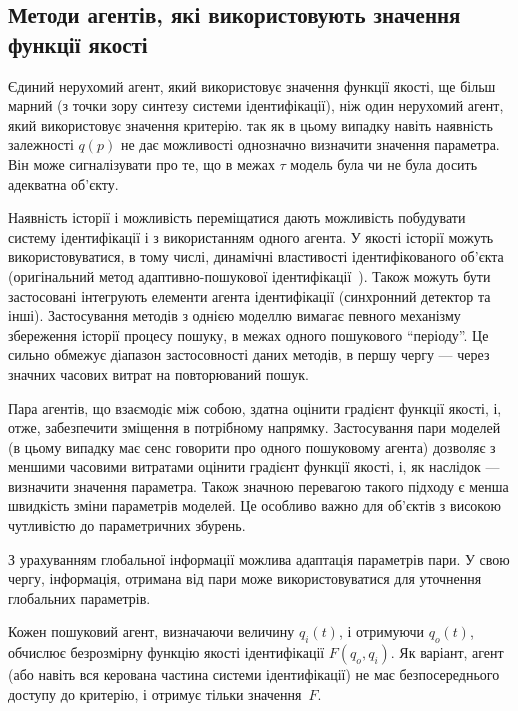
\subsection{Методи агентів, які використовують значення функції якості}%

Єдиний нерухомий агент, який використовує значення функції якості, ще більш марний
(з точки зору синтезу системи ідентифікації), ніж один нерухомий агент, який
використовує значення критерію.
%
так як в цьому випадку навіть наявність залежності
$q(p)$ не дає можливості однозначно визначити значення
параметра. Він може сигналізувати про те, що в межах \(\tau \) модель
була чи не була досить адекватна об'єкту.

Наявність історії і можливість переміщатися дають можливість
побудувати систему ідентифікації і з використанням одного агента.
У якості історії
можуть використовуватися, в тому числі, динамічні властивості
ідентифікованого об'єкта
(оригінальний метод адаптивно-пошукової ідентифікації~\cite{mich_92,mich_92}).
Також можуть бути застосовані інтегрують елементи агента
ідентифікації (синхронний детектор та інші).
Застосування методів з однією моделлю вимагає певного механізму
збереження історії процесу пошуку, в межах
одного пошукового ``періоду''. Це сильно обмежує діапазон
застосовності даних методів, в першу чергу --- через значних
часових витрат на повторюваний пошук.

Пара агентів, що взаємодіє між собою, здатна оцінити градієнт функції якості,
і, отже, забезпечити зміщення в потрібному напрямку.
Застосування пари моделей \cite{atu_asau3} (в цьому випадку має сенс
говорити про одного пошуковому агента) дозволяє з меншими
часовими витратами оцінити градієнт функції якості, і,
як наслідок --- визначити значення параметра. Також значною
перевагою такого підходу є менша швидкість зміни параметрів
моделей. Це особливо важно для об'єктів з високою чутливістю
до параметричних збурень.

З урахуванням глобальної інформації можлива адаптація
параметрів пари. У свою чергу, інформація, отримана від пари
може використовуватися для уточнення глобальних параметрів.

Кожен пошуковий агент, визначаючи величину $q_{i}(t)$, і отримуючи $q_o(t)$,
обчислює безрозмірну функцію якості ідентифікації $F (q_o, q_i)$. Як
варіант, агент (або навіть вся керована частина системи ідентифікації) не має
безпосереднього доступу до критерію, і отримує тільки значення~$F$.


